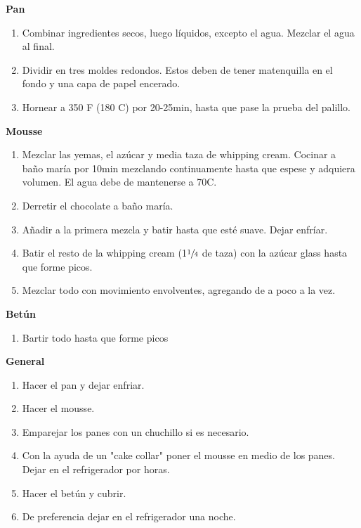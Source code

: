 \textbf{Pan}
\begin{enumerate}
\item Combinar ingredientes secos, luego líquidos, excepto el agua. Mezclar el agua al final.
\item Dividir en tres moldes redondos. Estos deben de tener matenquilla en el fondo y una capa de papel encerado.
\item Hornear a 350 F (180 C) por 20-25min, hasta que pase la prueba del palillo.
\end{enumerate}

\textbf{Mousse}
\begin{enumerate}
\item Mezclar las yemas, el azúcar y media taza de whipping cream. Cocinar a baño maría por \Sim 10min mezclando continuamente hasta que espese y adquiera volumen. El agua debe de mantenerse a \Sim 70C.
\item Derretir el chocolate a baño maría.
\item Añadir a la primera mezcla y batir hasta que esté suave.  Dejar enfríar.
\item Batir el resto de la whipping cream (1$\sfrac{1}{4}$ de taza) con la azúcar glass hasta que forme picos.
\item Mezclar todo con movimiento envolventes, agregando de a poco a la vez.
\end{enumerate}

\textbf{Betún}
\begin{enumerate}
\item Bartir todo hasta que forme picos
\end{enumerate}

\textbf{General}
\begin{enumerate}
\item Hacer el pan y dejar enfriar.
\item Hacer el mousse.
\item Emparejar los panes con un chuchillo si es necesario.
\item Con la ayuda de un "cake collar" poner el mousse en medio de los panes. Dejar en el refrigerador por  horas.
\item Hacer el betún y cubrir. 
\item De preferencia dejar en el refrigerador una noche.
\end{enumerate}